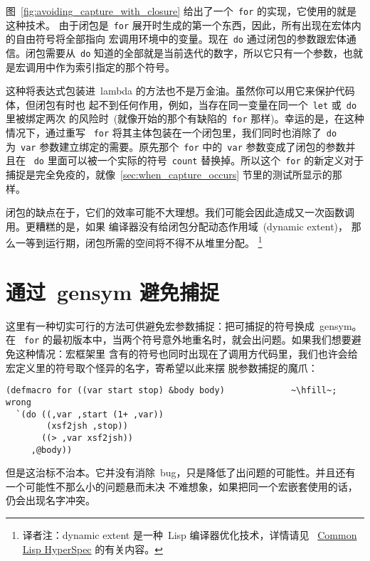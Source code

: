 图~\ref{fig:avoiding_capture_with_closure} 给出了一个~\texttt{for} 的实现，它使用的就是这种技术。
由于闭包是~\texttt{for} 展开时生成的第一个东西，因此，所有出现在宏体内的自由符号将全部指向
宏调用环境中的变量。现在~\texttt{do} 通过闭包的参数跟宏体通信。闭包需要从~\texttt{do}
知道的全部就是当前迭代的数字，所以它只有一个参数，也就是宏调用中作为索引指定的那个符号。

这种将表达式包装进~lambda 的方法也不是万金油。虽然你可以用它来保护代码体，但闭包有时也
起不到任何作用，例如，当存在同一变量在同一个~\texttt{let} 或~\texttt{do} 里被绑定两次
的风险时~(就像开始的那个有缺陷的~\texttt{for} 那样)。幸运的是，在这种情况下，通过重写
~\texttt{for} 将其主体包装在一个闭包里，我们同时也消除了~\texttt{do} 为~\texttt{var}
参数建立绑定的需要。原先那个~\texttt{for} 中的~\texttt{var} 参数变成了闭包的参数并且在
~\texttt{do} 里面可以被一个实际的符号~\texttt{count} 替换掉。所以这个~\texttt{for}
的新定义对于捕捉是完全免疫的，就像~\ref{sec:when_capture_occurs} 节里的测试所显示的那
样。

闭包的缺点在于，它们的效率可能不大理想。我们可能会因此造成又一次函数调用。更糟糕的是，如果
编译器没有给闭包分配动态作用域~(dynamic extent)，
那么一等到运行期，闭包所需的空间将不得不从堆里分配。
\footnote{译者注：dynamic extent 是一种~Lisp 编译器优化技术，详情请见
~\href{http://www.lisp.org/HyperSpec/Body/dec_dynamic-extent.html\#dynamic-extent}{Common Lisp HyperSpec} 的有关内容。}

\section{通过~gensym 避免捕捉}
\label{sec:avoiding_capture_with_gensyms}

这里有一种切实可行的方法可供避免宏参数捕捉：把可捕捉的符号换成~gensym。在
~\texttt{for} 的最初版本中，当两个符号意外地重名时，就会出问题。如果我们想要避免这种情况：宏框架里
含有的符号也同时出现在了调用方代码里，我们也许会给宏定义里的符号取个怪异的名字，寄希望以此来摆
脱参数捕捉的魔爪：
\begin{lstlisting}[escapechar=\~]
(defmacro for ((var start stop) &body body)             ~\hfill~; wrong
  `(do ((,var ,start (1+ ,var))
        (xsf2jsh ,stop))
       ((> ,var xsf2jsh))
     ,@body))
\end{lstlisting}
但是这治标不治本。它并没有消除~bug，只是降低了出问题的可能性。并且还有一个可能性不那么小的问题悬而未决
\pozhehao{}不难想象，如果把同一个宏嵌套使用的话，仍会出现名字冲突。

